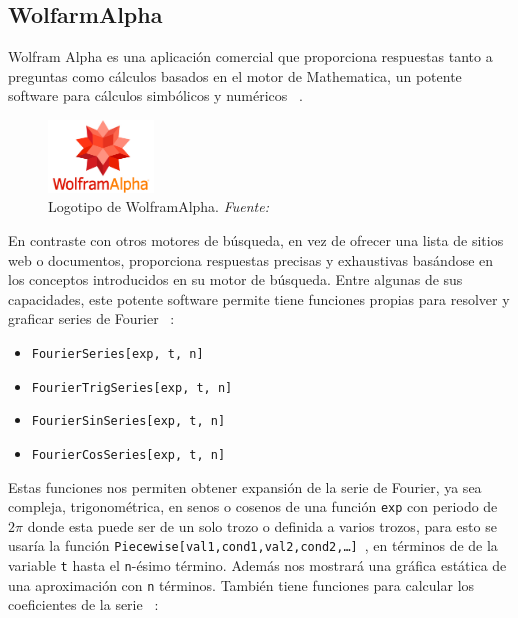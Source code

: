 \subsection{WolfarmAlpha}
Wolfram Alpha es una aplicación comercial que proporciona respuestas tanto a preguntas como cálculos basados en el motor de Mathematica, un potente software para cálculos simbólicos y numéricos ~\cite{wolframMatemathica}. 
\begin{figure}[H]
	\centering
	\includegraphics[width=0.25\textwidth]{img/chapter02/logo_wolfram.jpg}
	\caption[Logotipo de WolframAlpha.]{Logotipo de WolframAlpha. \textit{Fuente: ~\cite{wolframMatemathica}}}
	\label{fig:logo-wolfram}  %
\end{figure}
En contraste con otros motores de búsqueda, en vez de ofrecer una lista de sitios web o documentos, proporciona respuestas precisas y exhaustivas basándose en los conceptos introducidos en su motor de búsqueda. Entre algunas de sus capacidades, este potente software permite tiene funciones propias para resolver y graficar series de Fourier ~\cite{wolfram2024}:
\begin{itemize}
		\item \texttt{FourierSeries[exp, t, n]}
		\item \texttt{FourierTrigSeries[exp, t, n]}
		\item \texttt{FourierSinSeries[exp, t, n]}
		\item \texttt{FourierCosSeries[exp, t, n]}
\end{itemize} 
Estas funciones nos permiten obtener expansión de la serie de Fourier, ya sea compleja, trigonométrica, en senos o cosenos  de una función \texttt{exp} con periodo de $2\pi$ donde esta puede ser de un solo trozo o definida a varios trozos, para esto se usaría la función \texttt{Piecewise[{{val1,cond1},{val2,cond2},…}]}~\cite{wolframMatemathicaPiecewise}, en términos de de la variable \texttt{t} hasta el \texttt{n}-ésimo término. Además nos mostrará una gráfica estática de una aproximación con \texttt{n} términos. También tiene funciones para calcular los coeficientes de la serie ~\cite{wolframMatemathica}:
